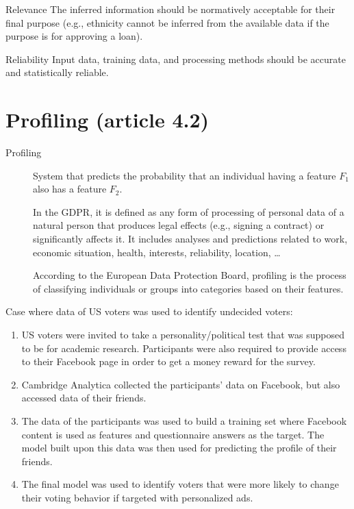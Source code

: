 \begin{description}
\begin{descriptionlist}
            \item[Relevance] 
                The inferred information should be normatively acceptable for their final purpose (e.g., ethnicity cannot be inferred from the available data if the purpose is for approving a loan).

            \item[Reliability] 
                Input data, training data, and processing methods should be accurate and statistically reliable.
        \end{descriptionlist}
\end{description}



\section{Profiling (article 4.2)}

\begin{description}
    \item[Profiling]   
        System that predicts the probability that an individual having a feature $F_1$ also has a feature $F_2$.

        In the GDPR, it is defined as any form of processing of personal data of a natural person that produces legal effects (e.g., signing a contract) or significantly affects it. It includes analyses and predictions related to work, economic situation, health, interests, reliability, location, \dots

        According to the European Data Protection Board, profiling is the process of classifying individuals or groups into categories based on their features.
\end{description}

\begin{example}
    Case where data of US voters was used to identify undecided voters:
    \begin{enumerate}
        \item US voters were invited to take a personality/political test that was supposed to be for academic research. Participants were also required to provide access to their Facebook page in order to get a money reward for the survey.
        \item Cambridge Analytica collected the participants' data on Facebook, but also accessed data of their friends.
        \item The data of the participants was used to build a training set where Facebook content is used as features and questionnaire answers as the target. The model built upon this data was then used for predicting the profile of their friends.
        \item The final model was used to identify voters that were more likely to change their voting behavior if targeted with personalized ads.
    \end{enumerate}
\end{example}


